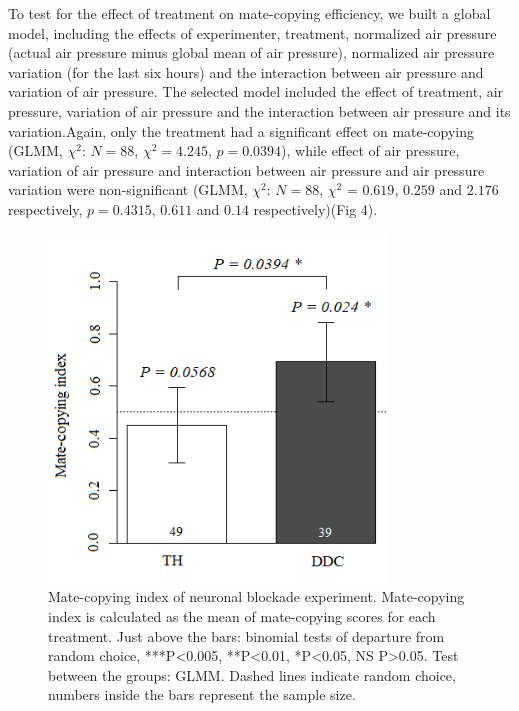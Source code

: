 \documentclass[a4paper, 12pt]{article}
\begin{document}
To test for the effect of treatment on mate-copying efficiency, we built a global model, including the effects of experimenter, treatment, normalized air pressure (actual air pressure minus global mean of air pressure), normalized air pressure variation (for the last six hours) and the interaction between air pressure and variation of air pressure. The selected model included the effect of treatment, air pressure, variation of air pressure and the interaction between air pressure and its variation.Again, only the treatment had a significant effect on mate-copying (GLMM, $\chi^2$: $N = 88$, $\chi^2 = 4.245$, $p = 0.0394$), while effect of air pressure, variation of air pressure and interaction between air pressure and air pressure variation were non-significant (GLMM, $\chi^2$: $N = 88$, $\chi^2$ = $0.619$, $0.259$ and $2.176$ respectively, $p = 0.4315$, $0.611$ and $0.14$ respectively)(Fig 4).

\clearpage




\begin{figure}
	\centering
	\includegraphics[width=0.8\textwidth]{images/mcnb}
	\caption{Mate-copying index of neuronal blockade experiment. Mate-copying index is calculated as the mean of mate-copying scores for each treatment. Just above the bars: binomial tests of departure from random choice, ***P<0.005, **P<0.01, *P<0.05, NS P>0.05. Test between the groups: GLMM. Dashed lines indicate random choice, numbers inside the bars represent the sample size.}
	\label{fig:mcsar}
\end{figure}
\end{document}
